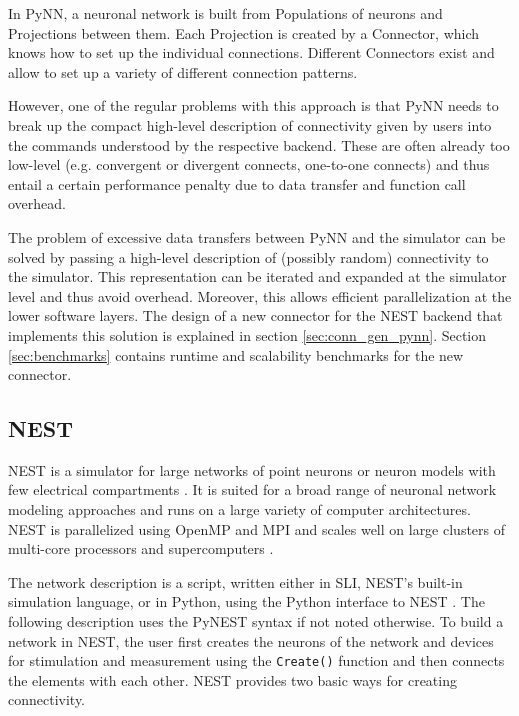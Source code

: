 \documentclass{frontiersSCNS} %
\begin{document}
In PyNN, a neuronal network is built from Populations of neurons and
Projections between them. Each Projection is created by a Connector,
which knows how to set up the individual connections. Different
Connectors exist and allow to set up a variety of different connection
patterns.

However, one of the regular problems with this approach is that PyNN
needs to break up the compact high-level description of connectivity
given by users into the commands understood by the respective
backend. These are often already too low-level (e.g. convergent or
divergent connects, one-to-one connects) and thus entail a certain
performance penalty due to data transfer and function call
overhead. %

The problem of excessive data transfers between PyNN and the simulator
can be solved by passing a high-level description of (possibly random)
connectivity to the simulator. This representation can be iterated and
expanded at the simulator level and thus avoid overhead. Moreover,
this allows efficient parallelization at the lower software layers.
The design of a new connector for the NEST backend that implements
this solution is explained in section \ref{sec:conn_gen_pynn}. Section
\ref{sec:benchmarks} contains runtime and scalability benchmarks for
the new connector.

\subsection{NEST}

NEST is a simulator for large networks of point neurons or neuron
models with few electrical compartments
\citep[\url{http://www.nest-initiative.org};][]{Gewaltig_07_11204}. It
is suited for a broad range of neuronal network modeling approaches
and runs on a large variety of computer architectures. NEST is
parallelized using OpenMP \citep{OpenMPSpec} and MPI
\citep{MPIForum94} and scales well on large clusters of multi-core
processors and supercomputers \citep{Helias12_26}.

The network description is a script, written either in SLI, NEST's
built-in simulation language, or in Python, using the Python interface
to NEST \citep[PyNEST;][]{Eppler09_12}. The following description uses
the PyNEST syntax if not noted otherwise. To build a network in NEST,
the user first creates the neurons of the network and devices for
stimulation and measurement using the \verb|Create()| function and
then connects the elements with each other. NEST provides two basic
ways for creating connectivity.
\end{document}
